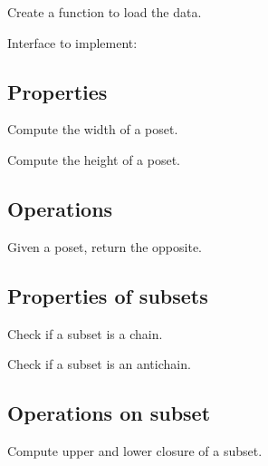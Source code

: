 
\begin{exercise}[Representation]
  Create a function to load the data.

  Interface to implement:
%

\end{exercise}


\subsection{Properties}


\begin{exercise}
  Compute the width of a poset.
\end{exercise}

\begin{exercise}
  Compute the height of a poset.
\end{exercise}

\subsection{Operations}


\begin{exercise}
  Given a poset, return the opposite.
\end{exercise}


\subsection{Properties of subsets}


\begin{exercise}
  Check if a subset is a chain.
\end{exercise}

\begin{exercise}
  Check if a subset is an antichain.
\end{exercise}


\subsection{Operations on subset}

\begin{exercise}
  Compute upper and lower closure of a subset.
\end{exercise}



